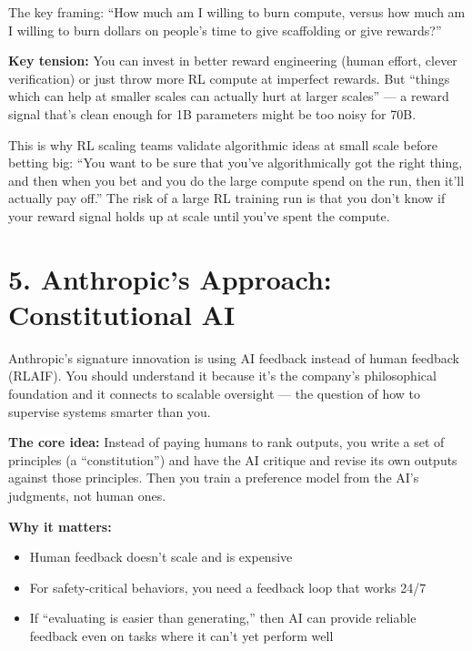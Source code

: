 The key framing: ``How much am I willing to burn compute, versus how much am I willing to burn dollars on people's time to give scaffolding or give rewards?''

\textbf{Key tension:} You can invest in better reward engineering (human effort, clever verification) or just throw more RL compute at imperfect rewards. But ``things which can help at smaller scales can actually hurt at larger scales'' --- a reward signal that's clean enough for 1B parameters might be too noisy for 70B.

\begin{deeper}
This is why RL scaling teams validate algorithmic ideas at small scale before betting big: ``You want to be sure that you've algorithmically got the right thing, and then when you bet and you do the large compute spend on the run, then it'll actually pay off.'' The risk of a large RL training run is that you don't know if your reward signal holds up at scale until you've spent the compute.
\end{deeper}

\section{5. Anthropic's Approach: Constitutional AI}

\begin{bluf}
Anthropic's signature innovation is using AI feedback instead of human feedback (RLAIF). You should understand it because it's the company's philosophical foundation and it connects to scalable oversight --- the question of how to supervise systems smarter than you.
\end{bluf}

\textbf{The core idea:} Instead of paying humans to rank outputs, you write a set of principles (a ``constitution'') and have the AI critique and revise its own outputs against those principles. Then you train a preference model from the AI's judgments, not human ones.

\textbf{Why it matters:}
\begin{itemize}
  \item Human feedback doesn't scale and is expensive
  \item For safety-critical behaviors, you need a feedback loop that works 24/7
  \item If ``evaluating is easier than generating,'' then AI can provide reliable feedback even on tasks where it can't yet perform well
\end{itemize}

